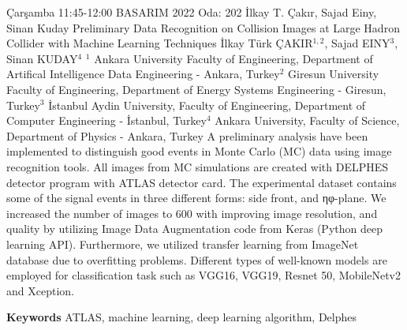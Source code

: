 
    \begin{abstract_basarim}
    {Çarşamba 11:45-12:00}
    {BASARIM 2022}
    {Oda: 202}
    {İlkay T. Çakır, Sajad Einy, Sinan Kuday}
    {Preliminary Data Recognition on Collision Images at Large Hadron Collider with Machine Learning Techniques}
    {%
    İlkay Türk ÇAKIR$^{1,2}$, Sajad EINY$^{3}$, Sinan KUDAY$^{4}$}
    {%
    }
    {%
    $^1$ Ankara University Faculty of Engineering, Department of Artifical Intelligence Data Engineering - Ankara, Turkey\newline{}$^2$ Giresun University Faculty of Engineering, Department of Energy Systems Engineering - Giresun, Turkey\newline{}$^3$ İstanbul Aydin University, Faculty of Engineering, Department of Computer Engineering - İstanbul, Turkey\newline{}$^4$ Ankara University, Faculty of Science, Department of Physics - Ankara, Turkey}
    A preliminary analysis have been implemented to distinguish good events in Monte Carlo (MC) data using image recognition tools. All images from MC simulations are created with DELPHES detector program with ATLAS detector card. The experimental dataset contains some of the signal events in three different forms: side front, and ηφ-plane. We increased the number of images to 600 with improving image resolution, and quality by utilizing Image Data Augmentation code from Keras (Python deep learning API). Furthermore, we utilized transfer learning from ImageNet database due to overfitting problems. Different types of well-known models are employed for classification task such as VGG16, VGG19, Resnet 50, MobileNetv2 and Xception.  
    
        \textbf{Keywords} \newline{}ATLAS, machine learning, deep learning algorithm, Delphes
    \end{abstract_basarim}
    